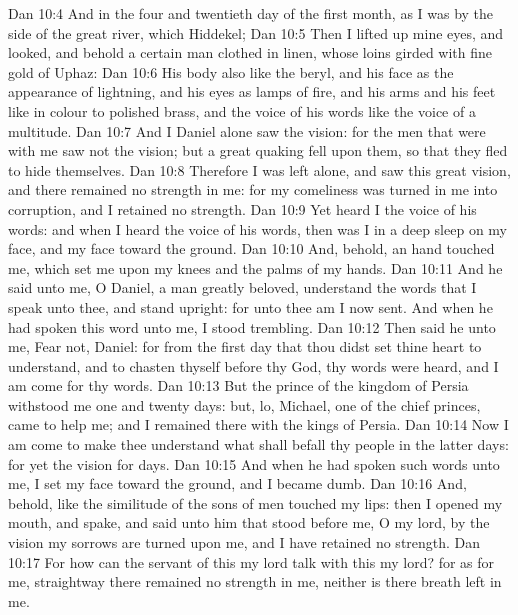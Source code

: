 \vs Dan 10:4 And in the four and twentieth day of the first month, as I was by the side of the great river, which  Hiddekel;
\vs Dan 10:5 Then I lifted up mine eyes, and looked, and behold a certain man clothed in linen, whose loins  girded with fine gold of Uphaz:
\vs Dan 10:6 His body also  like the beryl, and his face as the appearance of lightning, and his eyes as lamps of fire, and his arms and his feet like in colour to polished brass, and the voice of his words like the voice of a multitude.
\vs Dan 10:7 And I Daniel alone saw the vision: for the men that were with me saw not the vision; but a great quaking fell upon them, so that they fled to hide themselves.
\vs Dan 10:8 Therefore I was left alone, and saw this great vision, and there remained no strength in me: for my comeliness was turned in me into corruption, and I retained no strength.
\vs Dan 10:9 Yet heard I the voice of his words: and when I heard the voice of his words, then was I in a deep sleep on my face, and my face toward the ground.
\vs Dan 10:10 And, behold, an hand touched me, which set me upon my knees and  the palms of my hands.
\vs Dan 10:11 And he said unto me, O Daniel, a man greatly beloved, understand the words that I speak unto thee, and stand upright: for unto thee am I now sent. And when he had spoken this word unto me, I stood trembling.
\vs Dan 10:12 Then said he unto me, Fear not, Daniel: for from the first day that thou didst set thine heart to understand, and to chasten thyself before thy God, thy words were heard, and I am come for thy words.
\vs Dan 10:13 But the prince of the kingdom of Persia withstood me one and twenty days: but, lo, Michael, one of the chief princes, came to help me; and I remained there with the kings of Persia.
\vs Dan 10:14 Now I am come to make thee understand what shall befall thy people in the latter days: for yet the vision  for  days.
\vs Dan 10:15 And when he had spoken such words unto me, I set my face toward the ground, and I became dumb.
\vs Dan 10:16 And, behold,  like the similitude of the sons of men touched my lips: then I opened my mouth, and spake, and said unto him that stood before me, O my lord, by the vision my sorrows are turned upon me, and I have retained no strength.
\vs Dan 10:17 For how can the servant of this my lord talk with this my lord? for as for me, straightway there remained no strength in me, neither is there breath left in me.
